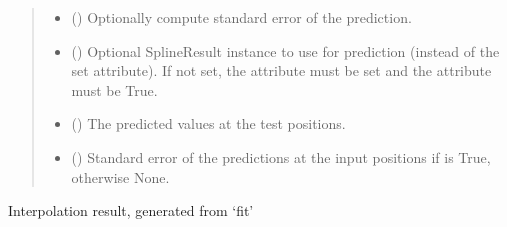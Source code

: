 \documentclass[letterpaper,10pt,english]{sphinxmanual}
\begin{document}
\begin{fulllineitems}
\begin{fulllineitems}
\begin{quote}
\begin{description}
\begin{itemize}
\item {}
\sphinxAtStartPar
{} () \textendash{} Optionally compute standard error of the prediction.

\item {}
\sphinxAtStartPar
{} () \textendash{} Optional SplineResult instance to use for prediction (instead of the
set  attribute). If not set, the  attribute must be
set and the  attribute must be True.

\end{itemize}

\sphinxAtStartPar
{}

\sphinxAtStartPar
\begin{itemize}
\item {}
\sphinxAtStartPar
{} () \textendash{} The predicted values at the test positions.

\item {}
\sphinxAtStartPar
{} () \textendash{} Standard error of the predictions at the input positions if
 is True, otherwise None.

\end{itemize}


\end{description}\end{quote}

\end{fulllineitems}


\begin{fulllineitems}
\label{\detokenize{splines:glomar_gridding.spline.Spline.result}}
\pysigstartsignatures
\pysigline
{}
\pysigstopsignatures
\sphinxAtStartPar
Interpolation result, generated from ‘fit’


\end{fulllineitems}
\end{fulllineitems}
\end{document}
